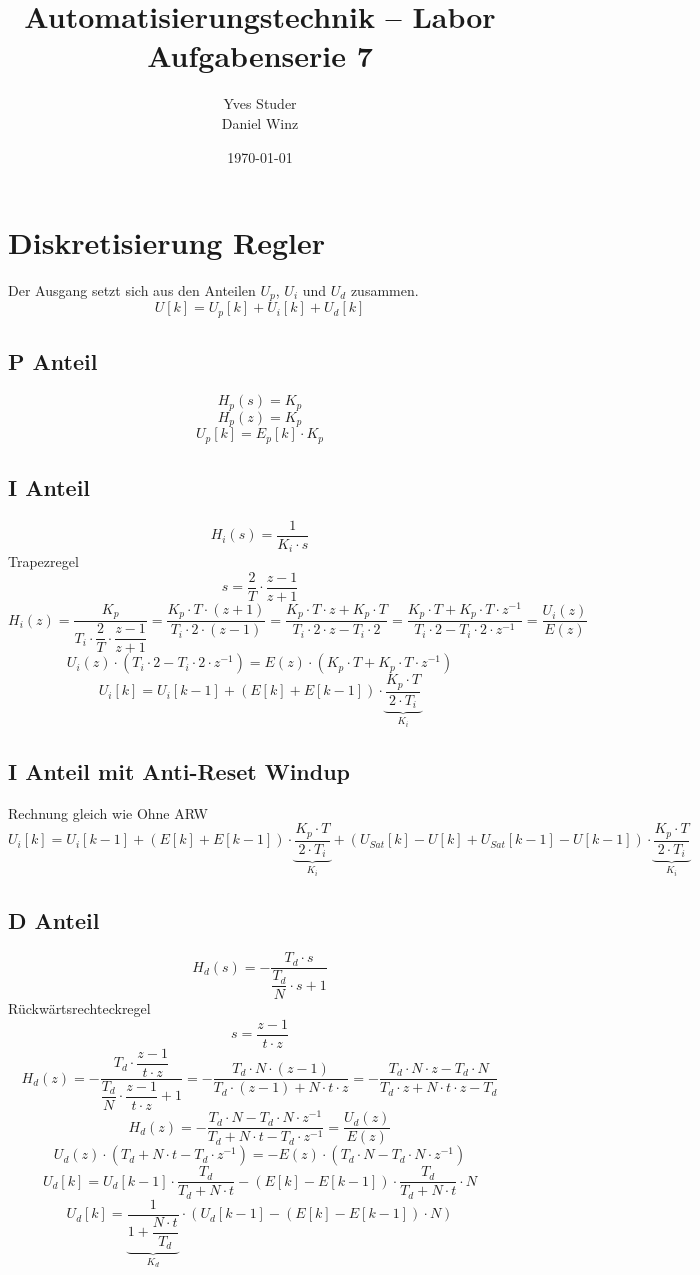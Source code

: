 \documentclass[a4,paper,fleqn]{article}
\title{Automatisierungstechnik -- Labor Aufgabenserie 7}
\date{\today}
\author{Yves Studer\\Daniel Winz}
\begin{document}
\maketitle
\clearpage
\section{Diskretisierung Regler}
Der Ausgang setzt sich aus den Anteilen $U_p$, $U_i$ und $U_d$ zusammen. 
\[ U[k] = U_p[k] + U_i[k] + U_d[k] \]

\subsection{P Anteil}
\[ H_p(s) = K_p \]
\[ H_p(z) = K_p \]
\[ U_p[k] = E_p[k] \cdot K_p \]

\subsection{I Anteil}
\[ H_i(s) = \frac{1}{K_i \cdot s} \]
Trapezregel
\[ s = \frac{2}{T} \cdot \frac{z - 1}{z + 1} \]
\[ H_i(z) = \frac{K_p}{T_i \cdot \dfrac{2}{T} \cdot \dfrac{z - 1}{z + 1}}
 = \frac{K_p \cdot T \cdot (z + 1)}{T_i \cdot 2 \cdot (z - 1)}
 = \frac{K_p \cdot T \cdot z + K_p \cdot T}{T_i \cdot 2 \cdot z - T_i \cdot 2}
 = \frac{K_p \cdot T + K_p \cdot T \cdot z^{-1}}{T_i \cdot 2 - T_i \cdot 2 \cdot z^{-1}}
 = \frac{U_i(z)}{E(z)} \]
\[ U_i(z) \cdot (T_i \cdot 2 - T_i \cdot 2 \cdot z^{-1})
 = E(z) \cdot (K_p \cdot T + K_p \cdot T \cdot z^{-1}) \]
\[ U_i[k] =  U_i[k-1] + \left(E[k] + E[k-1]\right) \cdot
 \underbrace{\frac{K_p \cdot T}{2 \cdot T_i}}_{K_i} \]

\subsection{I Anteil mit Anti-Reset Windup}
Rechnung gleich wie Ohne ARW
\[ U_i[k] =  U_i[k-1] + \left(E[k] + E[k-1]\right) \cdot
 \underbrace{\frac{K_p \cdot T}{2 \cdot T_i}}_{K_i}
 + \left(U_{Sat}[k] - U[k] + U_{Sat}[k-1] - U[k-1]\right) \cdot
 \underbrace{\frac{K_p \cdot T}{2 \cdot T_i}}_{K_i} \]

\subsection{D Anteil}
\[ H_d(s) = - \frac{T_d \cdot s}{\dfrac{T_d}{N} \cdot s + 1} \]
Rückwärtsrechteckregel
\[ s = \frac{z - 1}{t \cdot z} \]
\[ H_d(z) = -\frac{T_d \cdot \dfrac{z - 1}{t \cdot z}}{\dfrac{T_d}{N} \cdot \dfrac{z - 1}{t \cdot z} + 1}
 = -\frac{T_d \cdot N \cdot (z - 1)}{T_d \cdot (z - 1) + N \cdot t \cdot z}
 = -\frac{T_d \cdot N \cdot z - T_d \cdot N}{T_d \cdot z + N \cdot t \cdot z - T_d} \]
\[ H_d(z) = -\frac{T_d \cdot N - T_d \cdot N \cdot z^{-1}}{T_d + N \cdot t - T_d \cdot z^{-1}}
 = \frac{U_d(z)}{E(z)} \]
\[ U_d(z) \cdot (T_d + N \cdot t - T_d \cdot z^{-1})
 = - E(z) \cdot (T_d \cdot N - T_d \cdot N \cdot z^{-1}) \]
\[ U_d[k] = U_d[k-1] \cdot \frac{T_d}{T_d + N \cdot t}
 - \left(E[k] - E[k-1]\right) \cdot \frac{T_d}{T_d + N \cdot t} \cdot N \]
\[ U_d[k] = \underbrace{\frac{1}{1 + \dfrac{N \cdot t}{T_d}}}_{K_d} \cdot \left(U_d[k-1]
 - \left(E[k] - E[k-1]\right) \cdot N\right) \]
\end{document}
